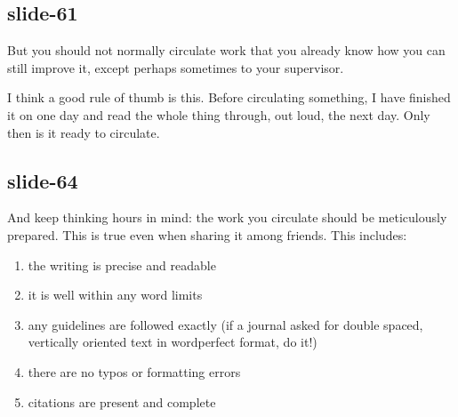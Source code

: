\documentclass[12pt,\papersize]{extarticle}
\begin{document}
\subsection{slide-61}
But you should not normally circulate work that you already know how you can still improve it, except 
perhaps sometimes to your supervisor.
 
I think a good rule of thumb is this.  
Before circulating something, I have finished it on one day
and read the whole thing through, out loud, the next day.
Only then is it ready to circulate.
 
\subsection{slide-64}
And keep thinking hours in mind: the work you circulate should be meticulously prepared.
This is true even when sharing it among friends.
This includes:
\begin{enumerate}
\item the writing is precise and readable
\item it is well within any word limits
\item any guidelines are followed exactly (if a journal asked for double spaced, vertically oriented text in wordperfect format, do it!)
\item there are no typos or formatting errors
\item citations are present and complete 
\end{enumerate}
 
 






\end{document}
